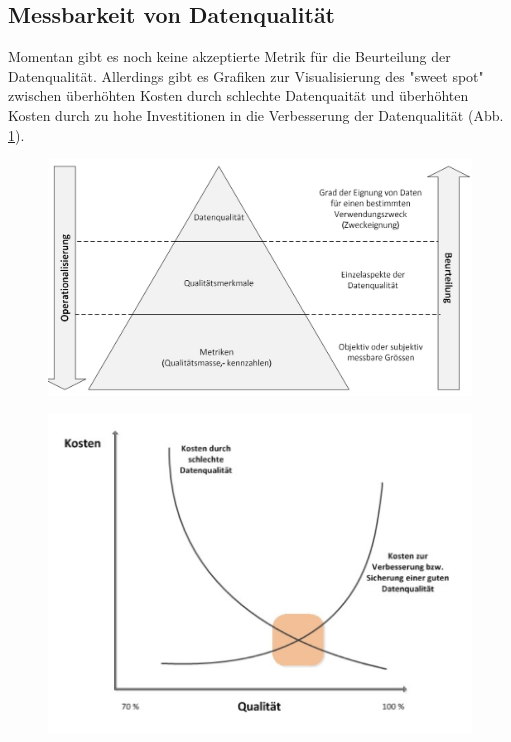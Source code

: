 \documentclass[a4paper, 11pt]{article}
\begin{document}
\newpage

\subsection{Messbarkeit von Datenqualität}
Momentan gibt es noch keine akzeptierte Metrik für die Beurteilung der Datenqualität. Allerdings gibt es Grafiken zur Visualisierung des "sweet spot" zwischen überhöhten Kosten durch schlechte Datenquaität und überhöhten Kosten durch zu hohe Investitionen in die Verbesserung der Datenqualität (Abb. \ref{fig:costQuality}). 

\begin{figure}[htb!]
\centering
\begin{minipage}{.45\textwidth}
	\centering
	\includegraphics[keepaspectratio=true,height=10\baselineskip]{messungDatenQualitaet.PNG}
	\label{fig:measureQuality}
\end{minipage}
\begin{minipage}{.45\textwidth}
	\centering
	\includegraphics[keepaspectratio=true,height=10\baselineskip]{kostenNutzung.PNG}
	\label{fig:costQuality}
\end{minipage}
\end{figure}
\end{document}
